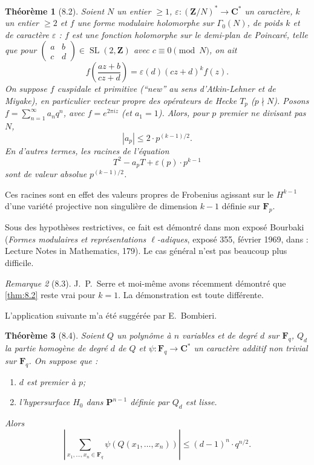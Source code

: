 \documentclass[12pt,a4paper]{amsart}
\theoremstyle{plain}
\newtheorem{theoreme}{Th\'eor\`eme}[section]
\theoremstyle{definition}
\theoremstyle{remark}
\newtheorem{remarque}[theoreme]{Remarque}
\DeclareMathOperator{\SL}{SL}
\newcommand{\Z}{\mathbf{Z}}
\newcommand{\F}{\mathbf{F}}
\newcommand{\C}{\mathbf{C}}
\numberwithin{equation}{section}
\begin{document}
\begin{theoreme}[8.2]\label{thm:8.2}
Soient $N$ un entier $\ge 1$, $\varepsilon:(\Z/N)^\ast\to\C^\ast$ un caract\`ere, $k$ un entier $\ge 2$ et $f$ une forme modulaire holomorphe sur $\Gamma_0(N)$, de poids $k$ et de caract\`ere $\varepsilon$ : $f$ est une fonction holomorphe sur le demi-plan de Poincar\'e, telle que pour $\begin{pmatrix} a&b\\ c&d \end{pmatrix}\in\SL(2,\Z)$ avec $c\equiv 0\pmod{N}$, on ait
\[
f\left(\frac{az+b}{cz+d}\right) = \varepsilon(d)(cz+d)^k f(z).
\]
On suppose $f$ cuspidale et primitive (``new'' au sens d'Atkin-Lehner et de Miyake), en particulier vecteur propre des op\'erateurs de Hecke $T_p$ ($p\nmid N$). Posons $f=\sum_{n=1}^\infty a_n q^n$, avec $f=e^{2\pi iz}$ (et $a_1=1$). Alors, pour $p$ premier ne divisant pas $N$,
\[
|a_p| \le 2 \cdot p^{(k-1)/2}.
\]
En d'autres termes, les racines de l'\'equation
\[
T^2 - a_p T + \varepsilon(p) \cdot p^{k-1}
\]
sont de valeur absolue $p^{(k-1)/2}$.
\end{theoreme}

Ces racines sont en effet des valeurs propres de Frobenius agissant sur le $H^{k-1}$ d'une vari\'et\'e projective non singuli\`ere de dimension $k-1$ d\'efinie sur $\F_p$.

Sous des hypoth\`eses restrictives, ce fait est d\'emontr\'e dans mon expos\'e Bourbaki (\textit{Formes modulaires et repr\'esentations $\ell$-adiques}, expos\'e 355, f\'evrier 1969, dans : Lecture Notes in Mathematics, 179). Le cas g\'en\'eral n'est pas beaucoup plus difficile.

\begin{remarque}[8.3]\label{rem:8.3}
J.~P.~Serre et moi-m\^eme avons r\'ecemment d\'emontr\'e que \eqref{thm:8.2} reste vrai pour $k=1$. La d\'emonstration est toute diff\'erente.
\end{remarque}

L'application suivante m'a \'et\'e sugg\'er\'ee par E.~Bombieri.

\begin{theoreme}[8.4]\label{thm:8.4}
Soient $Q$ un polyn\^ome \`a $n$ variables et de degr\'e $d$ sur $\F_q$, $Q_d$ la partie homog\`ene de degr\'e $d$ de $Q$ et $\psi:\F_q\to\C^\ast$ un caract\`ere additif non trivial sur $\F_q$. On suppose que :
\begin{enumerate}
\item[(i)] $d$ est premier \`a $p$;
\item[(ii)] l'hypersurface $H_0$ dans $\mathbf{P}^{n-1}$ d\'efinie par $Q_d$ est lisse.
\end{enumerate}
Alors
\[
\left|\sum_{x_1,\ldots,x_n\in\F_q} \psi(Q(x_1,\ldots,x_n))\right| \le (d-1)^n \cdot q^{n/2}.
\]
\end{theoreme}
\end{document}
